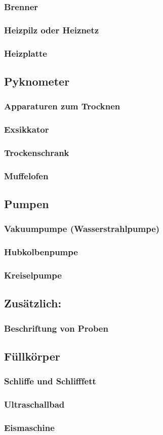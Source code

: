 \subsubsection{Brenner}
\subsubsection{Heizpilz oder Heiznetz}
\subsubsection{Heizplatte}

\subsection{Pyknometer}

\subsubsection{Apparaturen zum Trocknen}
\subsubsection{Exsikkator}
\subsubsection{Trockenschrank}
\subsubsection{Muffelofen}

\subsection{Pumpen}
\subsubsection{Vakuumpumpe (Wasserstrahlpumpe)}
\subsubsection{Hubkolbenpumpe}
\subsubsection{Kreiselpumpe}

\subsection{Zusätzlich:}
\subsubsection{Beschriftung von Proben}
\subsection{Füllkörper}
\subsubsection{Schliffe und Schlifffett}
\subsubsection{Ultraschallbad}
\subsubsection{Eismaschine}